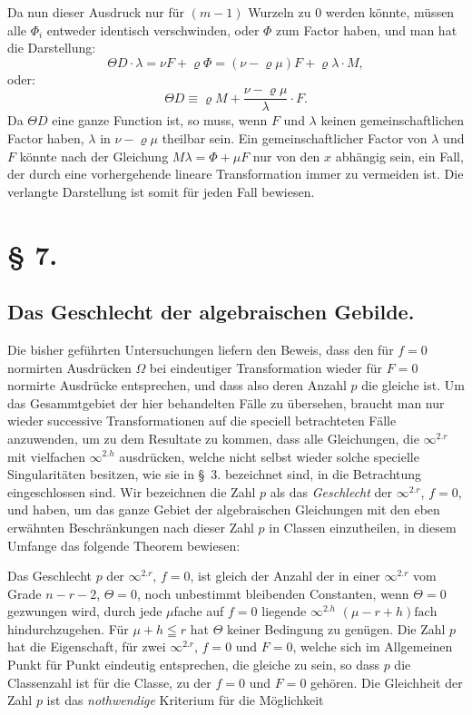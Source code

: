 \documentclass{article}
\begin{document}
Da nun dieser Ausdruck nur für $(m - 1)$ Wurzeln zu $0$ werden könnte, müssen alle $\Phi_i$ entweder identisch verschwinden, oder $\Phi$ zum Factor haben, und man hat die Darstellung:
\[
\Theta D \cdot \lambda = \nu F + \varrho \Phi = (\nu - \varrho \mu) F + \varrho \lambda \cdot M ,
\]
oder:
\[
\Theta D \equiv \varrho M + \frac{\nu - \varrho \mu}{\lambda} \cdot F .
\]
Da $\Theta D$ eine ganze Function ist, so muss, wenn $F$ und $\lambda$ keinen gemeinschaftlichen Factor haben, $\lambda$ in $\nu - \varrho \mu$ theilbar sein. Ein gemeinschaftlicher Factor von $\lambda$ und $F$ könnte nach der Gleichung $M \lambda = \Phi + \mu F$ nur von den $x$ abhängig sein, ein Fall, der durch eine vorhergehende lineare Transformation immer zu vermeiden ist. Die verlangte Darstellung ist somit für jeden Fall bewiesen.

\section*{§ 7.}

\subsection*{Das Geschlecht der algebraischen Gebilde.}

Die bisher geführten Untersuchungen liefern den Beweis, dass den für $f = 0$ normirten Ausdrücken $\Omega$ bei eindeutiger Transformation wieder für $F = 0$ normirte Ausdrücke entsprechen, und dass also deren Anzahl $p$ die gleiche ist. Um das Gesammtgebiet der hier behandelten Fälle zu übersehen, braucht man nur wieder successive Transformationen auf die speciell betrachteten Fälle anzuwenden, um zu dem Resultate zu kommen, dass alle Gleichungen, die $\infty^{2.r}$ mit vielfachen $\infty^{2.h}$ ausdrücken, welche nicht selbst wieder solche specielle Singularitäten besitzen, wie sie in §~3. bezeichnet sind, in die Betrachtung eingeschlossen sind. Wir bezeichnen die Zahl $p$ als das \emph{Geschlecht} der $\infty^{2.r}$, $f = 0$, und haben, um das ganze Gebiet der algebraischen Gleichungen mit den eben erwähnten Beschränkungen nach dieser Zahl $p$ in Classen einzutheilen, in diesem Umfange das folgende Theorem bewiesen:

Das Geschlecht $p$ der $\infty^{2.r}$, $f = 0$, ist gleich der Anzahl der in einer $\infty^{2.r}$ vom Grade $n - r - 2$, $\Theta = 0$, noch unbestimmt bleibenden Constanten, wenn $\Theta = 0$ gezwungen wird, durch jede $\mu$fache auf $f = 0$ liegende $\infty^{2.h}$ $(\mu - r + h)\text{fach}$ hindurchzugehen. Für $\mu + h \leqq r$ hat $\Theta$ keiner Bedingung zu genügen.
Die Zahl $p$ hat die Eigenschaft, für zwei $\infty^{2.r}$, $f = 0$ und $F = 0$, welche sich im Allgemeinen Punkt für Punkt eindeutig entsprechen, die gleiche zu sein, so dass $p$ die Classenzahl ist für die Classe, zu der $f = 0$ und $F = 0$ gehören. Die Gleichheit der Zahl $p$ ist das \emph{nothwendige} Kriterium für die Möglichkeit
\end{document}
